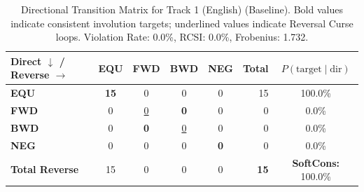 \begin{table}[ht]
\centering
\small
\begin{tabular}{l|cccc|r|c}
\toprule
\textbf{Direct $\downarrow$ / Reverse $\rightarrow$} & \textbf{EQU} & \textbf{FWD} & \textbf{BWD} & \textbf{NEG} & \textbf{Total} & \textbf{$P(\text{target} \mid \text{dir})$} \\
\midrule
\textbf{EQU} & \textbf{15} & 0 & 0 & 0 & 15 & 100.0\% \\
\textbf{FWD} & 0 & \underline{0} & \textbf{0} & 0 & 0 & 0.0\% \\
\textbf{BWD} & 0 & \textbf{0} & \underline{0} & 0 & 0 & 0.0\% \\
\textbf{NEG} & 0 & 0 & 0 & \textbf{0} & 0 & 0.0\% \\
\midrule
\textbf{Total Reverse} & 15 & 0 & 0 & 0 & \textbf{15} & \textbf{SoftCons:} 100.0\% \\
\bottomrule
\end{tabular}
\caption{Directional Transition Matrix for Track 1 (English) (Baseline). Bold values indicate consistent involution targets; underlined values indicate Reversal Curse loops. Violation Rate: 0.0\%, RCSI: 0.0\%, Frobenius: 1.732.}
\label{tab:transition_matrix}
\end{table}